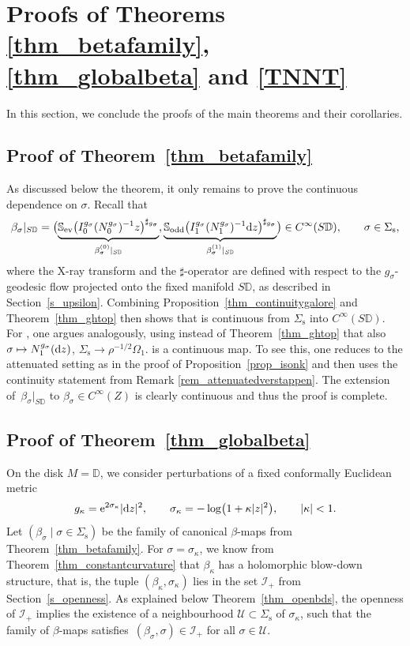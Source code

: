 \documentclass[pdftex]{sigma}
\numberwithin{equation}{section}
\theoremstyle{definition}
\newcommand{\DD}{\mathbb{D}} %
\newcommand{\1}{{\bf 1}}
\begin{document}
\section[Proofs of Theorems 3.8, 1.3 and 1.4]{Proofs of Theorems \ref{thm_betafamily}, \ref{thm_globalbeta} and \ref{TNNT}}\label{s_tnnt}

In this section, we conclude the proofs of the main theorems and their corollaries.

\subsection{Proof of Theorem~\ref{thm_betafamily}} \label{s_proof_betafamily}
As discussed below the theorem, it only remains to prove the continuous dependence on $\sigma$. Recall that
\[
	\beta_\sigma|_{S\DD} = \bigl(\underbrace{\mathbb S_\mathrm{ev}\bigl( I_0^{g_\sigma}(N_0^{g_\sigma})^{-1}z\bigr)^{\sharp_{g_\sigma}}}_{\beta^{(0)}_\sigma|_{S\DD}}
	, \underbrace{\mathbb S_\mathrm{odd} \bigl( I_1^{g_\sigma}(N_1^{g_\sigma})^{-1}{\rm d}z\bigr)^{\sharp_{g_\sigma}}}_{\beta^{(1)}_\sigma|_{S\DD}} \bigr) \in C^\infty(S\DD),\qquad \sigma\in \Sigma_\mathrm{s},
\]
where the X-ray transform and the $\sharp$-operator are defined with respect to the $g_\sigma$-geodesic flow projected onto the fixed manifold $S\DD$, as described in Section~\ref{s_upsilon}. Combining Proposition~\ref{thm_continuitygalore} and Theorem~\ref{thm_ghtop} then shows that  is continuous from $\Sigma_\mathrm{s}$ into $C^\infty(S\DD)$. For , one argues analogously, using instead of Theorem~\ref{thm_ghtop} that also
$\sigma\mapsto N_1^{g_{\sigma}}({\rm d}z)$, $ \Sigma_\mathrm{s} \to \rho^{-1/2}\Omega_1$.
is a continuous map. To see this, one reduces to the attenuated setting as in the proof of Proposition~\ref{prop_isonk} and then uses the continuity statement from Remark \ref{rem_attenuatedverstappen}.
The extension of~$\beta_\sigma|_{S \DD}$ to $\beta_\sigma \in C^\infty(Z)$ is clearly continuous and thus the proof is complete.




\subsection[Proof of Theorem 1.3]{Proof of Theorem~\ref{thm_globalbeta}} \label{proof_globalbeta}
On the disk $M=\DD$, we consider perturbations of a fixed conformally Euclidean metric
\[
	g_\kappa = {\rm e}^{2\sigma_\kappa}|{\rm d}z|^2,\qquad \sigma_\kappa=-\log\bigl(1+\kappa|z|^2\bigr),\qquad |\kappa|<1.
\]
Let $(\beta_\sigma\mid \sigma\in \Sigma_\mathrm{s})$ be the family of canonical $\beta$-maps from Theorem~\ref{thm_betafamily}. For $\sigma=\sigma_\kappa$, we know from Theorem~\ref{thm_constantcurvature} that $\beta_\kappa$ has a holomorphic blow-down structure, that is, the tuple $(\beta_\kappa,\sigma_\kappa)$ lies in the set $\mathcal I_+$ from Section~\ref{s_openness}. As explained below Theorem~\ref{thm_openbds}, the openness of $\mathcal I_+$ implies the existence of a neighbourhood $\mathcal U\subset \Sigma_\mathrm{s}$ of $\sigma_\kappa$, such that the family of $\beta$-maps satisfies~$
	(\beta_\sigma,\sigma)\in \mathcal I_+$ for all $\sigma\in \mathcal U.
$
\end{document}
